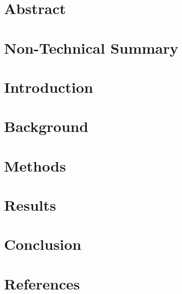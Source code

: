 \documentclass[12pt]{article}
\begin{document}
\pagestyle{plain}

\title{}
\author{John DeSalvo}
\maketitle

\tableofcontents

\section{Abstract}

\section{Non-Technical Summary}

\section{Introduction}

\section{Background}

\section{Methods}

\section{Results}

\section{Conclusion}

\section{References}
\end{document}
